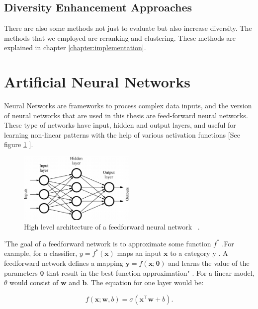 \subsection{Diversity Enhancement Approaches}

There are also some methods not just to evaluate but also increase diversity. The methods that we employed are reranking and clustering. These methods are explained in chapter \ref{chapter:implementation}.

\section{Artificial Neural Networks}\label{research:nn}

Neural Networks are frameworks to process complex data inputs, and the version of neural networks that are used in this thesis are feed-forward neural networks. These type of networks have input, hidden and output layers, and useful for learning non-linear patterns with the help of various activation functions [See figure \ref{fig:ffnn} ].

\begin{figure}[htp]
	\centering
	\includegraphics[width=0.5\textwidth]{figures/FFNN.png}
	\caption{High level architecture of a feedforward neural network ~\parencite{nnimagesource}.}
	\label{fig:ffnn}
\end{figure}


'The goal of a feedforward network is to approximate some function $f^{*}$ .For example, for a classifier,  $y=f^{*}(\boldsymbol{x})$ maps an input  $\boldsymbol{x}$ to a category y .  A feedforward network  defines a mapping $\boldsymbol{y}=f(\boldsymbol{x} ; \boldsymbol{\theta})$ and learns the value of the parameters $\boldsymbol{\theta}$  that result in the best function approximation" \cite{Goodfellow-et-al-2016}. For a linear model, $\theta$ would consist of $\boldsymbol{w}$ and $\boldsymbol{b}$. The equation for one layer would be: 

\begin{equation}
f(\boldsymbol{x} ; \boldsymbol{w}, b)=\sigma(\boldsymbol{x}^{\top} \boldsymbol{w}+b) .
\label{eq:nn-one-layer}
\end{equation} 

